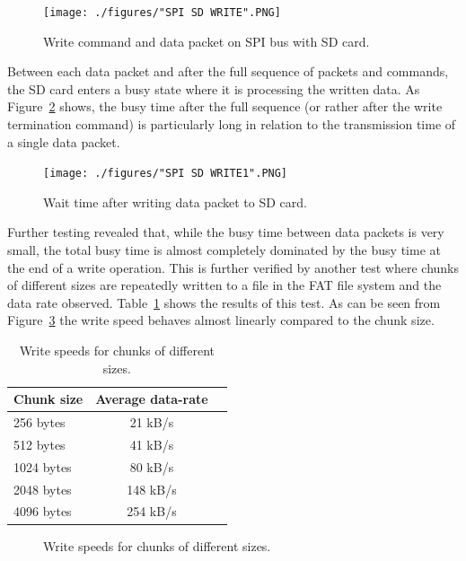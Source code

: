 \begin{figure}[H]
    \centering \texttt{[image: ./figures/"SPI SD WRITE".PNG]}
    \caption{Write command and data packet on SPI bus with SD card.}
    \label{fig:sd_card_write}
\end{figure}

Between each data packet and after the full sequence of packets and commands, the SD card enters a busy state where it is processing the written data. As Figure~\ref{fig:sd_card_write_wait} shows, the busy time after the full sequence (or rather after the write termination command) is particularly long in relation to the transmission time of a single data packet.

\begin{figure}[H]
    \centering \texttt{[image: ./figures/"SPI SD WRITE1".PNG]}
    \caption{Wait time after writing data packet to SD card.}
    \label{fig:sd_card_write_wait}
\end{figure}

Further testing revealed that, while the busy time between data packets is very small, the total busy time is almost completely dominated by the busy time at the end of a write operation. This is further verified by another test where chunks of different sizes are repeatedly written to a file in the FAT file system and the data rate observed. Table~\ref{tab:write_speed} shows the results of this test. As can be seen from Figure~\ref{fig:write_speed} the write speed behaves almost linearly compared to the chunk size.

\begin{table}[htbp]
    \caption{Write speeds for chunks of different sizes.}
    \label{tab:write_speed}
    \centering\begin{tabular}{@{}lcr@{}} \toprule
    \textbf{Chunk size} & \textbf{Average data-rate} \\ \midrule
        256 bytes & 21 kB/s \\
        512 bytes & 41 kB/s \\
        1024 bytes & 80 kB/s \\
        2048 bytes & 148 kB/s \\
        4096 bytes & 254 kB/s \\ \bottomrule
    \end{tabular}
\end{table}

\begin{figure}[H]
\centering
{}
\caption{Write speeds for chunks of different sizes.}
\label{fig:write_speed}
\end{figure}

